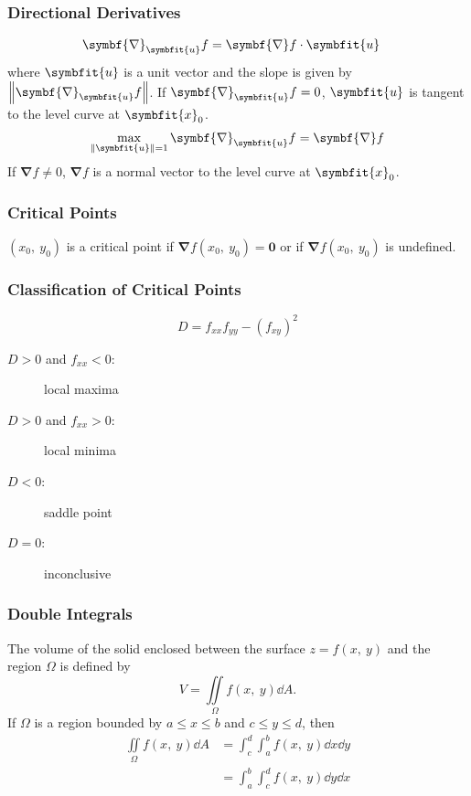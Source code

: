 \documentclass{article}
\begin{document}
\begin{multicols}{3}
    \subsubsection*{Directional Derivatives}
    \begin{align*}
        \symbf{\nabla}_{\symbfit{u}}f
         & = \symbf{\nabla}f \cdot \symbfit{u}
    \end{align*}
    where $\symbfit{u}$ is a unit vector and the slope is given by $\norm{\symbf{\nabla}_{\symbfit{u}}f}$.
    If $\symbf{\nabla}_{\symbfit{u}}f=0$, $\symbfit{u}$ is tangent to the level curve at $\symbfit{x}_0$.
    \begin{align*}
        \max_{\norm{\symbfit{u}} = 1} \symbf{\nabla}_{\symbfit{u}}f = \symbf{\nabla}f
    \end{align*}
    If $\symbf{\nabla}f\neq 0$, $\symbf{\nabla}f$ is a normal vector to the level curve at $\symbfit{x}_0$.
    \subsubsection*{Critical Points}
    $(x_0,\: y_0)$ is a critical point if $\symbf{\nabla}f(x_0,\: y_0) = \symbf{0}$
    or if $\symbf{\nabla}f(x_0,\: y_0)$ is undefined.
    \subsubsection*{Classification of Critical Points}
    \begin{equation*}
        D = f_{xx}f_{yy} - \left( f_{xy} \right)^2
    \end{equation*}
    \begin{description}
        \item[$D > 0$ and $f_{xx} < 0$:] local maxima
        \item[$D > 0$ and $f_{xx} > 0$:] local minima
        \item[$D < 0$:] saddle point
        \item[$D = 0$:] inconclusive
    \end{description}
    \subsubsection*{Double Integrals}
    The volume of the solid
    enclosed between the surface $z=f(x,\: y)$ and the region $\Omega$ is
    defined by
    \begin{equation*}
        V = \iint\limits_{\Omega} f(x,\: y) \dd{A}.
    \end{equation*}
    If $\Omega$ is a region bounded by $a \leq x \leq b$ and $c \leq y \leq d$, then
    \begin{align*}
        \iint\limits_{\Omega} f(x,\: y) \dd{A} & = \int_c^d\int_a^b f(x,\: y) \dd{x} \dd{y} \\
                                               & = \int_a^b\int_c^d f(x,\: y) \dd{y} \dd{x}
    \end{align*}

\end{multicols}
\end{document}
